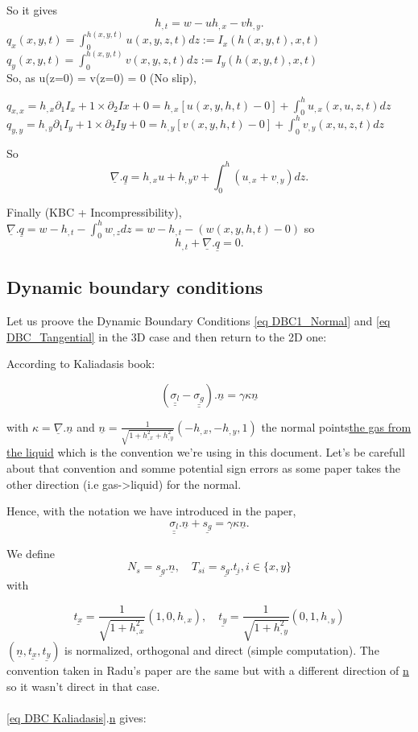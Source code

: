 \documentclass[12pt]{article}
\begin{document}
So it gives $$h_{,t}=w-uh_{,x}-vh_{,y}.$$
$q_{x}(x,y,t)=\int_{0}^{h(x, y, t)}u(x, y, z,t)dz:=I_x(h(x, y, t), x,t)$\\
$q_y(x, y, t)= \int_{0}^{h(x, y, t)}v(x, y, z,t)dz:=I_y(h(x, y, t), x,t)$\\

So, as u(z=0) = v(z=0) = 0 (No slip),

$q_{x,x}=h_{,x}\partial_1I_x+1\times\partial_2Ix+0= h_{,x}[u(x, y,h,t)-0] + \int_{0}^h u_{,x}(x, u, z, t)dz$\\
$q_{y,y}=h_{,y}\partial_1I_y+1\times\partial_2Iy+0= h_{,y}[v(x, y,h,t)-0] + \int_{0}^h v_{,y}(x, u, z, t)dz$

So $$\underline{\nabla}.\underline{q}=h_{,x}u+h_{,y}v+\int_{0}^h(u_{,x}+v_{,y})dz.$$

Finally (KBC + Incompressibility),
$\underline{\nabla}.\underline{q}=w-h_{,t} - \int_{0}^h w_{,z}dz = w-h_{,t}-(w(x, y, h, t) - 0)$ so $$h_{,t}+\underline{\nabla}.\underline{q}=0.$$
\subsection{Dynamic boundary conditions}
Let us proove the Dynamic Boundary Conditions \ref{eq DBC1_Normal} and \ref{eq DBC_Tangential} in the 3D case and then return to the 2D one:

According to Kaliadasis book: 

\begin{equation}\label{eq DBC Kaliadasis}(\underline{\underline{\sigma_l}}-\underline{\underline{\sigma_g}}).\underline{n}=\gamma\kappa\underline{n}
\end{equation}

with $\kappa = \underline{\nabla}.\underline{n}$ and $\underline{n}=\frac{1}{\sqrt{1+h_{,x}^2+h_{,y}^2}}(-h_{,x}, -h_{,y}, 1)$ the normal points\underline{the gas from the liquid} which is the convention we're using in this document. Let's be carefull about that convention and somme potential sign errors as some paper takes the other direction (i.e gas->liquid) for the normal.

Hence, with the notation we have introduced in the paper, $$\underline{\underline{\sigma_l}}.\underline{n}+\underline{s_g}=\gamma\kappa\underline{n}.$$

We define $$N_s = \underline{s_g}.\underline{n}, \quad T_{si}=\underline{s_g}.\underline{t_i}, i\in\{x, y\}$$ with 

$$\underline{t_x}=\frac{1}{\sqrt{1+h_{,x}^2}}(1, 0, h_{,x}),\quad \underline{t_y}=\frac{1}{\sqrt{1+h_{,y}^2}}(0, 1, h_{,y})$$ 
$(\underline{n}, \underline{t_x}, \underline{t_y})$ is normalized, orthogonal and direct (simple computation). The convention taken in Radu's paper are the same but with a different direction of \underline{n} so it wasn't direct in that case.
\newline
\\
\\
\ref{eq DBC Kaliadasis}.\underline{n} gives:
\end{document}
